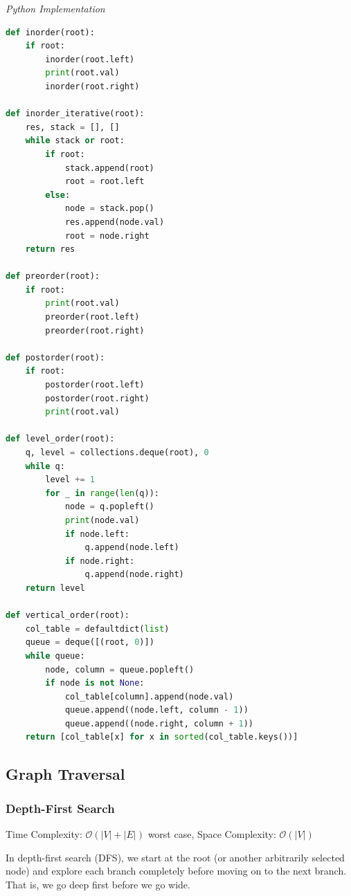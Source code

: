 \documentclass{article}
\newcommand{\bigO}{\mathcal{O}}
\begin{document}
\vspace{8pt} \emph{Python Implementation}
\begin{lstlisting}[language=Python]  
def inorder(root): 
    if root: 
        inorder(root.left) 
        print(root.val)
        inorder(root.right) 

def inorder_iterative(root):
    res, stack = [], [] 
    while stack or root:
        if root:
            stack.append(root)
            root = root.left
        else:
            node = stack.pop()
            res.append(node.val)
            root = node.right
    return res

def preorder(root): 
    if root: 
        print(root.val)
        preorder(root.left) 
        preorder(root.right)

def postorder(root): 
    if root: 
        postorder(root.left) 
        postorder(root.right) 
        print(root.val)

def level_order(root):
    q, level = collections.deque(root), 0
    while q:
        level += 1
        for _ in range(len(q)):
            node = q.popleft()
            print(node.val)
            if node.left:
                q.append(node.left)
            if node.right:
                q.append(node.right)
    return level
    
def vertical_order(root):
    col_table = defaultdict(list)
    queue = deque([(root, 0)])
    while queue:
        node, column = queue.popleft()
        if node is not None:
            col_table[column].append(node.val)
            queue.append((node.left, column - 1))
            queue.append((node.right, column + 1))
    return [col_table[x] for x in sorted(col_table.keys())]
\end{lstlisting}
    \subsection{Graph Traversal}

    \subsubsection{Depth-First Search }
    Time Complexity: $\bigO(|V| + |E|)$ worst case, Space Complexity: $\bigO(|V|)$
    
    In depth-first search (DFS), we start at the root (or another arbitrarily selected node) and explore each branch completely before moving on to the next branch. That is, we go deep first before we go wide. 
    
    
\end{document}
